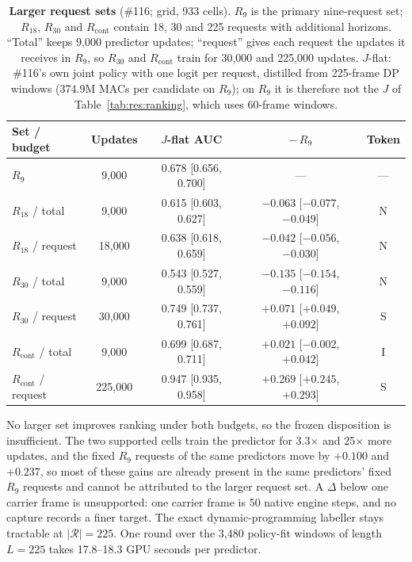 \begin{table}[h]
\begin{revblock}
\centering
\footnotesize
\caption{\textbf{Larger request sets} (\#116; grid, 933 cells). $R_9$ is the primary nine-request set; $R_{18}$, $R_{30}$ and $R_{\mathrm{cont}}$ contain 18, 30 and 225 requests with additional horizons. ``Total'' keeps 9,000 predictor updates; ``request'' gives each request the updates it receives in $R_9$, so $R_{30}$ and $R_{\mathrm{cont}}$ train for 30,000 and 225,000 updates. $J$-flat: \#116's own joint policy with one logit per request, distilled from 225-frame DP windows (374.9M MACs per candidate on $R_9$); on $R_9$ it is therefore not the $J$ of Table~\ref{tab:res:ranking}, which uses 60-frame windows.}
\label{tab:app:res:scaling}
\begin{tabular}{@{}lcccc@{}}
\toprule
Set / budget & Updates & $J$-flat AUC & $-\,R_9$ & Token \\
\midrule
$R_9$ & 9,000 & 0.678 [0.656, 0.700] & --- & --- \\
$R_{18}$ / total & 9,000 & 0.615 [0.603, 0.627] & $-0.063$ [$-0.077$, $-0.049$] & N \\
$R_{18}$ / request & 18,000 & 0.638 [0.618, 0.659] & $-0.042$ [$-0.056$, $-0.030$] & N \\
$R_{30}$ / total & 9,000 & 0.543 [0.527, 0.559] & $-0.135$ [$-0.154$, $-0.116$] & N \\
$R_{30}$ / request & 30,000 & 0.749 [0.737, 0.761] & $+0.071$ [$+0.049$, $+0.092$] & S \\
$R_{\mathrm{cont}}$ / total & 9,000 & 0.699 [0.687, 0.711] & $+0.021$ [$-0.002$, $+0.042$] & I \\
$R_{\mathrm{cont}}$ / request & 225,000 & 0.947 [0.935, 0.958] & $+0.269$ [$+0.245$, $+0.293$] & S \\
\bottomrule
\end{tabular}
\end{revblock}
\end{table}

\begin{revblock}
No larger set improves ranking under both budgets, so the frozen disposition is insufficient. The two supported cells train the predictor for 3.3$\times$ and 25$\times$ more updates, and the fixed $R_9$ requests of the same predictors move by $+0.100$ and $+0.237$, so most of these gains are already present in the same predictors' fixed $R_9$ requests and cannot be attributed to the larger request set. A $\Delta$ below one carrier frame is unsupported: one carrier frame is 50 native engine steps, and no capture records a finer target. The exact dynamic-programming labeller stays tractable at $|\mathcal{R}|=225$. One round over the 3,480 policy-fit windows of length $L=225$ takes 17.8--18.3 GPU seconds per predictor.
\end{revblock}

